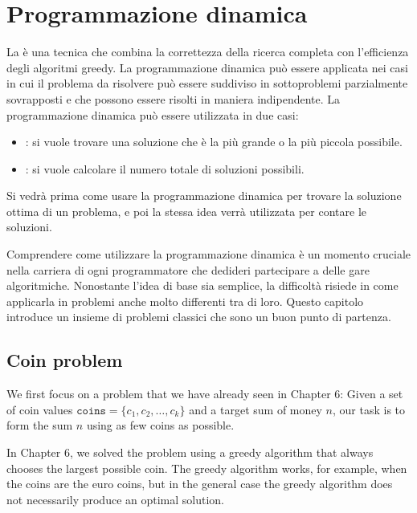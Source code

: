 \chapter{Programmazione dinamica}


La 
è una tecnica che combina la correttezza della
ricerca completa con l'efficienza degli algoritmi
greedy.
La programmazione dinamica può essere
applicata nei casi in cui il problema da risolvere
può essere suddiviso in sottoproblemi
parzialmente sovrapposti e che possono
essere risolti in maniera indipendente.
La programmazione dinamica può essere utilizzata
in due casi:

\begin{itemize}
\item
{}:
si vuole trovare una soluzione che è la
più grande o la più piccola possibile.
\item
{}:
si vuole calcolare il numero totale di 
soluzioni possibili.
\end{itemize}

Si vedrà prima come usare la programmazione
dinamica per trovare la soluzione ottima di un problema,
e poi la stessa idea verrà utilizzata per 
contare le soluzioni.

Comprendere come utilizzare la programmazione dinamica
è un momento cruciale nella carriera di ogni
programmatore che dedideri partecipare a delle gare algoritmiche.
Nonostante l'idea di base sia semplice,
la difficoltà risiede in come applicarla
in problemi anche molto differenti tra di loro.
Questo capitolo introduce un insieme di problemi classici 
che sono un buon punto di partenza.

\section{Coin problem}

We first focus on a problem that we
have already seen in Chapter 6:
Given a set of coin values $\texttt{coins} = \{c_1,c_2,\ldots,c_k\}$
and a target sum of money $n$, our task is to
form the sum $n$ using as few coins as possible.

In Chapter 6, we solved the problem using a
greedy algorithm that always chooses the largest
possible coin.
The greedy algorithm works, for example,
when the coins are the euro coins,
but in the general case the greedy algorithm
does not necessarily produce an optimal solution.

